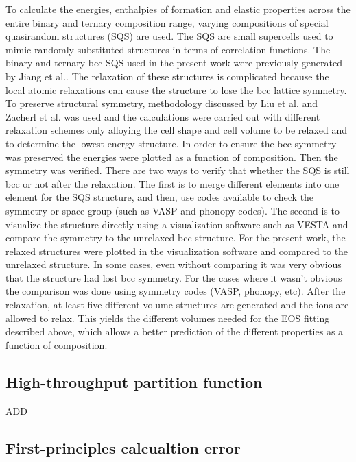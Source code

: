 To calculate the energies, enthalpies of formation and elastic properties across the entire binary and ternary composition range, varying compositions of special quasirandom structures (SQS) are used. The SQS are small supercells used to mimic randomly substituted structures in terms of correlation functions. The binary and ternary bcc SQS used in the present work were previously generated by Jiang et al.\cite{Jiang2004,Jiang2009}. The relaxation of these structures is complicated because the local atomic relaxations can cause the structure to lose the bcc lattice symmetry. To preserve structural symmetry, methodology discussed by Liu et al. \cite{Liu2013} and Zacherl et al. \cite{Zacherl2012} was used and the calculations were carried out with different relaxation schemes only alloying the cell shape and cell volume to be relaxed and to determine the lowest energy structure. In order to ensure the bcc symmetry was preserved the energies were plotted as a function of composition. Then the symmetry was verified. There are two ways to verify that whether the SQS is still bcc or not after the relaxation. The first is to merge different elements into one element for the SQS structure, and then, use codes available to check the symmetry or space group (such as VASP and phonopy codes). The second is to visualize the structure directly using a visualization software such as VESTA and compare the symmetry to the unrelaxed bcc structure. For the present work, the relaxed structures were plotted in the visualization software and compared to the unrelaxed structure. In some cases, even without comparing it was very obvious that the structure had lost bcc symmetry. For the cases where it wasn't obvious the comparison was done using symmetry codes (VASP, phonopy, etc). After the relaxation, at least five different volume structures are generated and the ions are allowed to relax. This yields the different volumes needed for the EOS fitting described above, which allows a better prediction of the different properties as a function of composition. 

\subsection{High-throughput partition function}

ADD

\subsection{First-principles calcualtion error}

